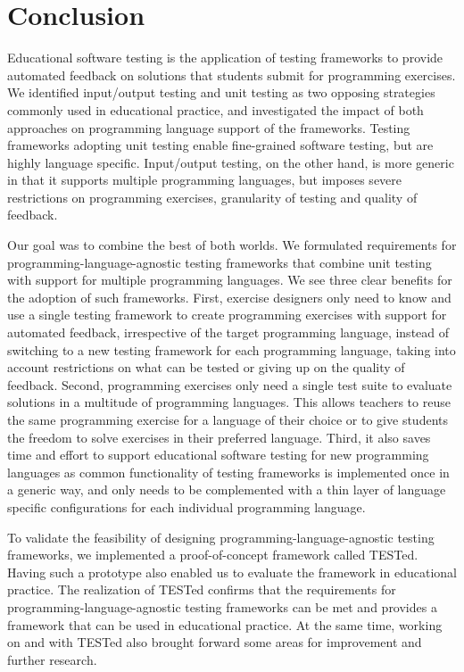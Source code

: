 \documentclass[../main]{subfiles}
\begin{document}
\section{Conclusion}\label{sec:tested1-conclusion}

Educational software testing is the application of testing frameworks to provide automated feedback on solutions that students submit for programming exercises.
We identified input/output testing and unit testing as two opposing strategies commonly used in educational practice, and investigated the impact of both approaches on programming language support of the frameworks.
Testing frameworks adopting unit testing enable fine-grained software testing, but are highly language specific.
Input/output testing, on the other hand, is more generic in that it supports multiple programming languages, but imposes severe restrictions on programming exercises, granularity of testing and quality of feedback.

Our goal was to combine the best of both worlds.
We formulated requirements for programming-language-agnostic testing frameworks that combine unit testing with support for multiple programming languages.
We see three clear benefits for the adoption of such frameworks.
First, exercise designers only need to know and use a single testing framework to create programming exercises with support for automated feedback, irrespective of the target programming language, instead of switching to a new testing framework for each programming language, taking into account restrictions on what can be tested or giving up on the quality of feedback.
Second, programming exercises only need a single test suite to evaluate solutions in a multitude of programming languages.
This allows teachers to reuse the same programming exercise for a language of their choice or to give students the freedom to solve exercises in their preferred language.
Third, it also saves time and effort to support educational software testing for new programming languages as common functionality of testing frameworks is implemented once in a generic way, and only needs to be complemented with a thin layer of language specific configurations for each individual programming language.

To validate the feasibility of designing programming-language-agnostic testing frameworks, we implemented a proof-of-concept framework called TESTed.
Having such a prototype also enabled us to evaluate the framework in educational practice.
The realization of TESTed confirms that the requirements for programming-language-agnostic testing frameworks can be met and provides a framework that can be used in educational practice.
At the same time, working on and with TESTed also brought forward some areas for improvement and further research.
\end{document}
